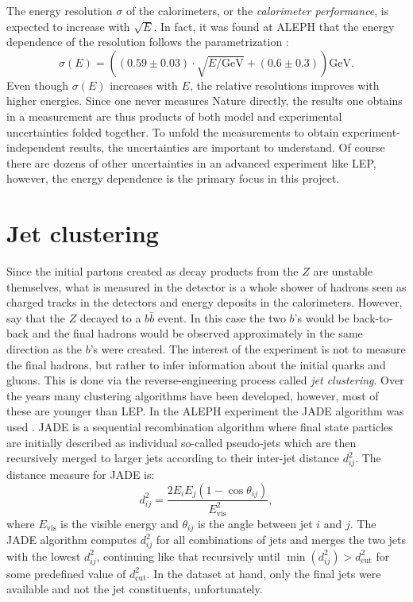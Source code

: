 \documentclass[a4paper, twoside, nobib]{tufte-book}
\newcommand{\autocite}[1]{\citep{#1}}
\begin{document}
The energy resolution $\sigma$ of the calorimeters, or the \emph{calorimeter performance}, is expected to increase with $\sqrt{E}$. In fact, it was found at ALEPH that the energy dependence of the resolution follows the parametrization \autocite{buskulicInvestigationBd0Bs01994}:
\begin{equation}
  \sigma(E) = \left( \left( 0.59 \pm 0.03 \right) \cdot \sqrt{E / \mathrm{GeV}} +  \left(0.6 \pm 0.3 \right) \right) \mathrm{GeV}.
\end{equation}
Even though $\sigma(E)$ increases with $E$, the relative resolutions improves with higher energies. Since one never measures Nature directly, the results one obtains in a measurement are thus products of both model and experimental uncertainties folded together. To unfold the measurements to obtain experiment-independent results, the uncertainties are important to understand. Of course there are dozens of other uncertainties in an advanced experiment like LEP, however, the energy dependence is the primary focus in this project. 

\section{Jet clustering}

Since the initial partons created as decay products from the $Z$ are unstable themselves, what is measured in the detector is a whole shower of hadrons seen as charged tracks in the detectors and energy deposits in the calorimeters. However, say that the $Z$  decayed to a $b\bar{b}$ event. In this case the two $b$'s would be back-to-back and the final hadrons would be observed approximately in the same direction as the $b$'s were created. The interest of the experiment is not to measure the final hadrons, but rather to infer information about the initial quarks and gluons. This is done via the reverse-engineering process called \emph{jet clustering}. Over the years many clustering algorithms have been developed, however, most of these are younger than LEP. In the ALEPH experiment the JADE algorithm was used \autocite{bartelExperimentalStudyJets1981}. JADE is a sequential recombination algorithm where final state particles are initially described as individual so-called pseudo-jets which are then recursively merged to larger jets according to their inter-jet distance $d^2_{ij}$. The distance measure for JADE is:
\begin{equation}
  d^2_{ij} = \frac{2E_i E_j (1 - \cos\theta_{ij})}{E^2_\mathrm{vis}},
\end{equation}
where $E_\mathrm{vis}$ is the visible energy and $\theta_{ij}$ is the angle between jet $i$ and $j$. The JADE algorithm computes $d^2_{ij}$ for all combinations of jets and merges the two jets with the lowest $d^2_{ij}$, continuing like that recursively until $\min(d^2_{ij}) > d^2_\mathrm{cut}$ for some predefined value of $d^2_\mathrm{cut}$. In the dataset at hand, only the final jets were available and not the jet constituents, unfortunately. 
\end{document}
